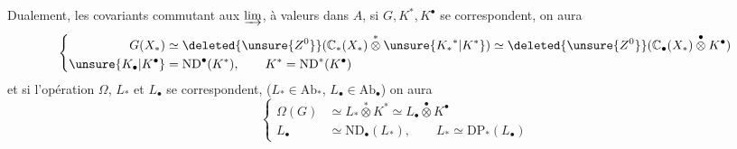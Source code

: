 Dualement,  les   covariants
commutant aux $\varinjlim$, à valeurs dans
$A$, si $G,K^*,K^\bullet$ se correspondent,
on aura
\[
\left\{\begin{aligned}
G(X_*)&\simeq\deleted{\unsure{Z^0}}(\mathbb C_*(X_*)\mathbin{\overset{*}{\otimes}}\unsure{{K_*}^*|K^*})
\simeq\deleted{\unsure{Z^0}}(\mathbb C_\bullet(X_*)\mathbin{\overset{\bullet}{\otimes}}K^\bullet)\\
\unsure{K_\bullet|K^\bullet}&=\mathrm{ND}^{\bullet}(K^*),\qquad K^*=\mathrm{ND}^*(K^\bullet)
\end{aligned}\right.
\]
et si l'opération $\Omega$, $L_*$ et $L_\bullet$ se
correspondent, ($L_*\in\mathrm{Ab}_*$, $L_\bullet\in\mathrm{Ab}_\bullet$)
on aura
\[
\left\{\begin{aligned}
\Omega(G)&\simeq L_*\mathbin{\overset{*}{\otimes}}K^*\simeq L_\bullet\mathbin{\overset{\bullet}{\otimes}}K^\bullet\\
L_\bullet&\simeq\mathrm{ND}_\bullet(L_*),\qquad L_*\simeq\mathrm{DP}_*(L_\bullet)
\end{aligned}\right.
\]
